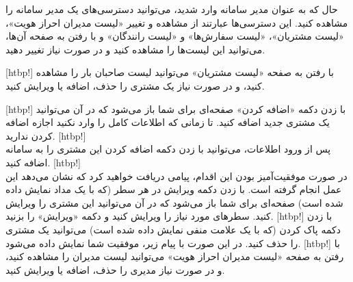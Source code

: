 			 حال که به عنوان مدیر سامانه وارد شدید، می‌توانید دسترسی‌های یک مدیر سامانه را مشاهده کنید. این دسترسی‌ها عبارتند از مشاهده و تغییر «لیست مدیران احراز هویت»، «لیست مشتریان»، «لیست سفارش‌ها» و «لیست رانندگان» و با رفتن به صفحه آن‌ها، می‌توانید این لیست‌ها را مشاهده کنید و در صورت نیاز تغییر دهید.

	[htbp!]
	 با رفتن به صفحه «لیست مشتریان» می‌توانید لیست صاحبان بار را مشاهده کنید، و در صورت نیاز یک مشتری را حذف، اضافه یا ویرایش کنید.

	[htbp!]
\newpage
		 با زدن دکمه «اضافه کردن» صفحه‌ای برای شما باز می‌شود که در آن می‌توانید یک مشتری جدید اضافه کنید. تا زمانی که اطلاعات کامل را وارد نکنید اجازه اضافه کردن ندارید.
[htbp!]
\\
پس از ورود اطلاعات، می‌توانید با زدن دکمه اضافه کردن این مشتری را به سامانه اضافه کنید.
[htbp!]
\\
در صورت موفقیت‌آمیز بودن این اقدام، پیامی دریافت خواهید کرد که نشان می‌دهد این عمل انجام گرفته است.
 با زدن دکمه ویرایش در هر سطر (که با یک مداد نمایش داده شده است) صفحه‌ای برای شما باز می‌شود که در آن می‌توانید این مشتری را ویرایش کنید. سطرهای مورد نیاز را ویرایش کنید و دکمه «ویرایش» را بزنید.
[htbp!]
	 با زدن دکمه پاک کردن (که با یک علامت منفی نمایش داده شده است) می‌توانید یک مشتری را حذف کنید. در این صورت با پیام زیر، موفقیت شما نمایش داده می‌شود.
[htbp!]
			 با رفتن به صفحه «لیست مدیران احراز هویت» می‌توانید لیست مدیران را مشاهده کنید، و در صورت نیاز مدیری را حذف، اضافه یا ویرایش کنید.

